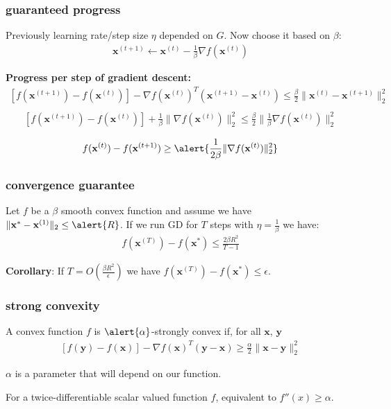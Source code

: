 \documentclass[compress]{beamer}
\newcommand{\bv}[1]{\mathbf{#1}}
\begin{document}
\begin{frame}[t]
	\frametitle{guaranteed progress}
	Previously learning rate/step size $\eta$ depended on $G$. Now choose it based on $\beta$:
	\begin{align*}
		\bv{x}^{(t+1)} \leftarrow \bv{x}^{(t)} - \frac{1}{\beta}\nabla f(\bv{x}^{(t)})
	\end{align*}
	
	\textbf{Progress per step of gradient descent:}
	\begin{align*}
		\left[f(\bv{x}^{(t+1)}) - f(\bv{x}^{(t)})\right] - \nabla f(\bv{x}^{(t)})^T(\bv{x}^{(t+1)} - \bv{x}^{(t)})  \leq \frac{\beta}{2}\|\bv{x}^{(t)} - \bv{x}^{(t+1)}\|_2^2\\
	\end{align*}
	\begin{align*}
		\left[f(\bv{x}^{(t+1)}) - f(\bv{x}^{(t)})\right] + 
		\frac{1}{\beta}\|\nabla f(\bv{x}^{(t)})\|_2^2 \leq \frac{\beta}{2}\|\frac{1}{\beta}\nabla f(\bv{x}^{(t)})\|_2^2 \\
	\end{align*}
	\begin{align*}
		f(\bv{x}^{(t)}) - f(\bv{x}^{(t+1)}) \geq \alert{\frac{1}{2\beta}\|\nabla f(\bv{x}^{(t)})\|_2^2}
	\end{align*}
	
\end{frame}

\begin{frame}[t]
	\frametitle{convergence guarantee}
	\begin{theorem}
		Let $f$ be a \alert{$\beta$} smooth convex function and assume we have $\|\bv{x}^{*} - \bv{x}^{(1)}\|_2 \leq \alert{R}$. If we run GD for $T$ steps with $\eta = \frac{1}{\beta}$ we have:
		\begin{align*}
			f(\bv{x}^{(T)}) - f(\bv{x}^*) \leq \frac{2\beta R^2}{T-1} 
		\end{align*} 
	\end{theorem}
	\textbf{Corollary}: If \alert{$T = O\left(\frac{\beta R^2}{\epsilon}\right)$} we have $f(\bv{x}^{(T)}) - f(\bv{x}^*) \leq \epsilon$.
\end{frame}

\begin{frame}[t]
	\frametitle{strong convexity}
	\begin{definition}
		A convex function $f$ is $\alert{\alpha}$-strongly convex if, for all $\bv{x}$, $\bv{y}$
		\begin{align*}
				\left[f(\bv{y}) - f(\bv{x})\right] - \nabla f(\bv{x})^T(\bv{y} - \bv{x}) \geq \frac{\alpha}{2}\|\bv{x} - \bv{y}\|_2^2 
		\end{align*}
	\end{definition}
	$\alpha$ is a parameter that will depend on our function.
	
	\vspace{7em}
	For a twice-differentiable scalar valued function $f$, equivalent to $f''(x) \geq \alpha$. 
\end{frame}
\end{document}

